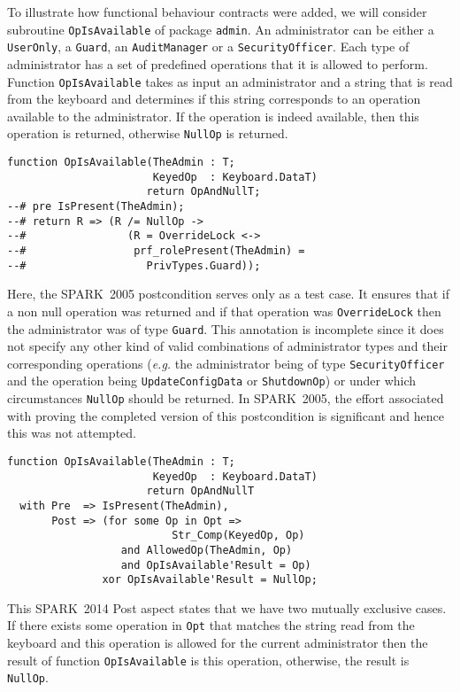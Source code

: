 \documentclass[10pt,a4paper,twocolumn]{article}
\newcommand{\oldspark}{SPARK~2005\xspace}
\newcommand{\newspark}{SPARK~2014\xspace}
\newcommand{\eg}{\textit{e.g.}\xspace}
\newcommand{\SPARK}[1]{\lstinline[language=Ada,basicstyle={\footnotesize
      \sffamily},framesep=0pt]$#1$}
\begin{document}
To illustrate how functional behaviour contracts were added, we will
consider subroutine \SPARK{OpIsAvailable} of package \SPARK{admin}. An
administrator can be either a \SPARK{UserOnly}, a \SPARK{Guard}, an
\SPARK{AuditManager} or a \SPARK{SecurityOfficer}. Each type of
administrator has a set of predefined operations that it is allowed to
perform. Function \SPARK{OpIsAvailable} takes as input an
administrator and a string that is read from the keyboard and
determines if this string corresponds to an operation available to the
administrator. If the operation is indeed available, then this
operation is returned, otherwise \SPARK{NullOp} is returned.

\begin{lstlisting}
function OpIsAvailable(TheAdmin : T;
                       KeyedOp  : Keyboard.DataT)
                      return OpAndNullT;
--# pre IsPresent(TheAdmin);
--# return R => (R /= NullOp ->
--#                (R = OverrideLock <->
--#                 prf_rolePresent(TheAdmin) =
--#                   PrivTypes.Guard));
\end{lstlisting}
Here, the \oldspark postcondition serves only as a test case. It
ensures that if a non null operation was returned and if that
operation was \SPARK{OverrideLock} then the administrator was of type
\SPARK{Guard}. This annotation is incomplete since it does not specify
any other kind of valid combinations of administrator types and their
corresponding operations (\eg the administrator being of type
\SPARK{SecurityOfficer} and the operation being
\SPARK{UpdateConfigData} or \SPARK{ShutdownOp}) or under which
circumstances \SPARK{NullOp} should be returned. In \oldspark, the
effort associated with proving the completed version of this
postcondition is significant and hence this was not attempted.

\begin{lstlisting}
function OpIsAvailable(TheAdmin : T;
                       KeyedOp  : Keyboard.DataT)
                      return OpAndNullT
  with Pre  => IsPresent(TheAdmin),
       Post => (for some Op in Opt =>
                          Str_Comp(KeyedOp, Op)
                  and AllowedOp(TheAdmin, Op)
                  and OpIsAvailable'Result = Op)
               xor OpIsAvailable'Result = NullOp;
\end{lstlisting}
This \newspark Post aspect states that we have two mutually
exclusive cases. If there exists some operation in \SPARK{Opt} that
matches the string read from the keyboard and this operation is
allowed for the current administrator then the result of function
\SPARK{OpIsAvailable} is this operation, otherwise, the result is
\SPARK{NullOp}.
\end{document}

